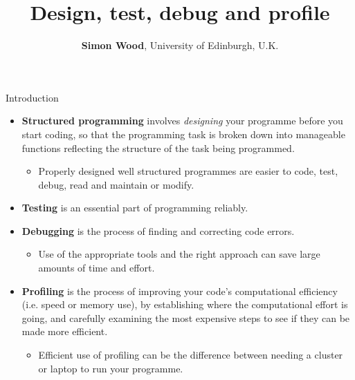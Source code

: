 \documentclass{beamer}
\title{Design, test, debug and profile}
\author{{\bf Simon Wood}, University of Edinburgh, U.K.}
\date{}
\begin{document}
\begin{frame}
\titlepage
\end{frame}

\begin{frame}{Introduction}
\begin{itemize}
\item {\bf Structured programming} involves {\em designing} your programme before you start coding, so that the programming task is broken down into manageable functions reflecting the structure of the task being programmed. 
\begin{itemize}
\item Properly designed well structured programmes are easier to code, test, debug, read and maintain or modify. 
\end{itemize}
\item {\bf Testing} is an essential part of programming reliably.
\item {\bf Debugging} is the process of finding and correcting code errors. 
\begin{itemize}
\item Use of the appropriate tools and the right approach can save large amounts of time and effort. 
\end{itemize}
\item {\bf Profiling} is the process of improving your code's computational efficiency (i.e. speed or memory use), by establishing where the computational effort is going, and carefully examining the most expensive steps to see if they can be made more efficient.
\begin{itemize}
\item Efficient use of profiling can be the difference between needing a cluster or laptop to run your programme.  
\end{itemize}
\end{itemize}
\end{frame}
\end{document}
